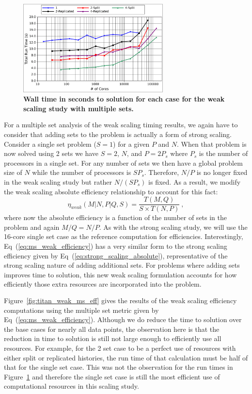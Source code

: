 \documentclass{snamc2013}
\begin{document}
\begin{figure}[h!]
  \begin{center}
    \includegraphics[width=3in]{titan_weak_ms_time.pdf}
  \end{center}
  \caption{\textbf{Wall time in seconds to solution for each case for
      the weak scaling study with multiple sets.}}
  \label{fig:titan_weak_ms_time}
\end{figure}

For a multiple set analysis of the weak scaling timing results, we
again have to consider that adding sets to the problem is actually a
form of strong scaling. Consider a single set problem ($S=1$) for a
given $P$ and $N$. When that problem is now solved using 2 sets we
have $S=2$, $N$, and $P=2P_s$ where $P_s$ is the number of processors in
a single set. For any number of sets we then have a global problem
size of $N$ while the number of processors is $SP_s$. Therefore,
$N/P$ is no longer fixed in the weak scaling study but rather
$N/(SP_s)$ is fixed. As a result, we modify the weak scaling absolute
efficiency relationship to account for this fact:
\begin{equation}
\eta_{weak}(M|N,P|Q,S) = \frac{T(M,Q)}{S \times T(N,P)}\:,
  \label{eq:ms_weak_efficiency}
\end{equation}
where now the absolute efficiency is a function of the number of sets
in the problem and again $M/Q = N/P$. As with the strong scaling
study, we will use the 16-core single set case as the reference
computation for efficiencies. Interestingly,
Eq~(\ref{eq:ms_weak_efficiency}) has a very similar form to the strong
scaling efficiency given by Eq~(\ref{eq:strong_scaling_absolute}),
representative of the strong scaling nature of adding additional
sets. For problems where adding sets improves time to solution, this
new weak scaling formulation accounts for how efficiently those extra
resources are incorporated into the problem.

Figure~\ref{fig:titan_weak_ms_eff} gives the results of the weak
scaling efficiency computations using the multiple set metric given by
Eq~(\ref{eq:ms_weak_efficiency}). Although we do reduce the time to
solution over the base cases for nearly all data points, the
observation here is that the reduction in time to solution is still
not large enough to efficiently use all resources. For example, for
the 2 set case to be a perfect use of resources with either split or
replicated histories, the run time of that calculation must be half of
that for the single set case. This was not the observation for the
run times in Figure~\ref{fig:titan_weak_ms_time} and therefore the
single set case is still the most efficient use of computational
resources in this scaling study.
\end{document}
